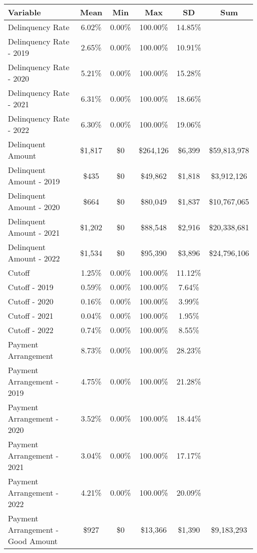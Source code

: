 \begin{tabular}{l|c|c|c|c|c}
\toprule 
\midrule 
Variable & Mean & Min & Max & SD & Sum \\
\midrule 
Delinquency Rate & 6.02\% & 0.00\% & 100.00\% & 14.85\% \\
\quad Delinquency Rate - 2019 & 2.65\% & 0.00\% & 100.00\% & 10.91\% \\
\quad Delinquency Rate - 2020 & 5.21\% & 0.00\% & 100.00\% & 15.28\% \\
\quad Delinquency Rate - 2021 & 6.31\% & 0.00\% & 100.00\% & 18.66\% \\
\quad Delinquency Rate - 2022 & 6.30\% & 0.00\% & 100.00\% & 19.06\% \\
\midrule 
Delinquent Amount & \$1,817 & \$0 & \$264,126 & \$6,399 & \$59,813,978 \\
\quad Delinquent Amount - 2019 & \$435 & \$0 & \$49,862 & \$1,818 & \$3,912,126 \\
\quad Delinquent Amount - 2020 & \$664 & \$0 & \$80,049 & \$1,837 & \$10,767,065 \\
\quad Delinquent Amount - 2021 & \$1,202 & \$0 & \$88,548 & \$2,916 & \$20,338,681 \\
\quad Delinquent Amount - 2022 & \$1,534 & \$0 & \$95,390 & \$3,896 & \$24,796,106 \\
\midrule 
Cutoff & 1.25\% & 0.00\% & 100.00\% & 11.12\% \\
\quad Cutoff - 2019 & 0.59\% & 0.00\% & 100.00\% & 7.64\% \\
\quad Cutoff - 2020 & 0.16\% & 0.00\% & 100.00\% & 3.99\% \\
\quad Cutoff - 2021 & 0.04\% & 0.00\% & 100.00\% & 1.95\% \\
\quad Cutoff - 2022 & 0.74\% & 0.00\% & 100.00\% & 8.55\% \\
\midrule 
Payment Arrangement & 8.73\% & 0.00\% & 100.00\% & 28.23\% \\
\quad Payment Arrangement - 2019 & 4.75\% & 0.00\% & 100.00\% & 21.28\% \\
\quad Payment Arrangement - 2020 & 3.52\% & 0.00\% & 100.00\% & 18.44\% \\
\quad Payment Arrangement - 2021 & 3.04\% & 0.00\% & 100.00\% & 17.17\% \\
\quad Payment Arrangement - 2022 & 4.21\% & 0.00\% & 100.00\% & 20.09\% \\
\quad Payment Arrangement - Good Amount & \$927 & \$0 & \$13,366 & \$1,390 & \$9,183,293 \\

\end{tabular}
